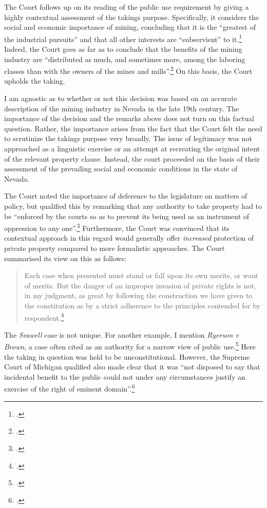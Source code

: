 {The Court follows up on its reading of the public use requirement by giving a highly contextual assessment of the takings purpose. Specifically, it considers the social and economic importance of mining, concluding that it is the ``greatest of the industrial pursuits'' and that all other interests are ``subservient'' to it.\footcite[409]{seawell76} Indeed, the Court goes as far as to conclude that the benefits of the mining industry are ``distributed as much, and sometimes more, among the laboring classes than with the owners of the mines and mills''.\footcite[409]{seawell76} On this basis, the Court upholds the taking.

I am agnostic as to whether or not this decision was based on an accurate description of the mining industry in Nevada in the late 19th century. The importance of the decision and the remarks above does not turn on this factual question. Rather, the importance arises from the fact that the Court felt the need to scrutinize the takings purpose very broadly. The issue of legitimacy was not approached as a linguistic exercise or an attempt at recreating the original intent of the relevant property clause. Instead, the court proceeded on the basis of their assessment of the prevailing social and economic conditions in the state of Nevada. 

The Court noted the importance of deference to the legislature on matters of policy, but qualified this by remarking that any authority to take property had to be ``enforced by the courts so as to prevent its being used as an instrument of oppression to any one''.\footcite[412]{seawell76} 
Furthermore, the Court was convinced that its contextual approach in this regard would generally offer {\it increased} protection of private property compared to more formalistic approaches. The Court summarised its view on this as follows:

\begin{quote}
Each case when presented must stand or fall upon its own merits, or want of merits. But the danger of an improper invasion of private rights is not, in my judgment, as great by following the construction we have given to the constitution as by a strict adherence to the principles contended for by respondent.\footcite[398]{seawell76}
\end{quote}

The {\it Seawell} case is not unique. For another example, I mention {\it Ryerson v Brown}, a case often cited as an authority for a narrow view of public use.\footcite{ryerson77} Here the taking in question was held to be unconstitutional. However, the Supreme Court of Michigan qualified also made clear that it was ``not disposed to say that incidental benefit to the public could not under any circumstances justify an exercise of the right of eminent domain''.\footcite[337]{ryerson77}

}
